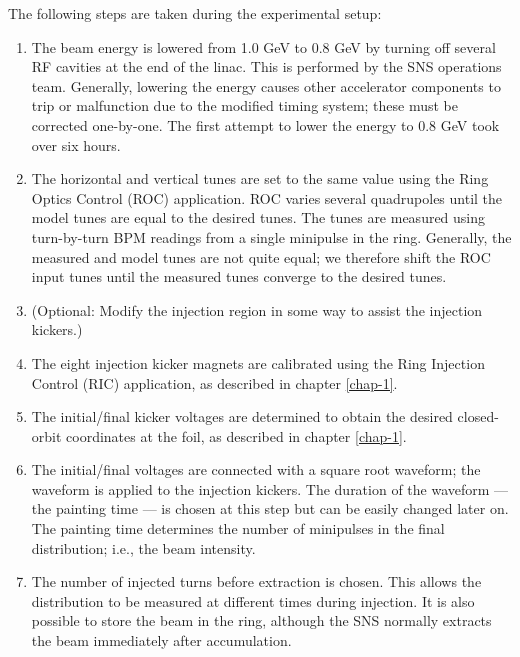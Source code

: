 The following steps are taken during the experimental setup:
%
\begin{enumerate}
    \item 
    The beam energy is lowered from 1.0 GeV to 0.8 GeV by turning off several RF cavities at the end of the linac. This is performed by the SNS operations team. Generally, lowering the energy causes other accelerator components to trip or malfunction due to the modified timing system; these must be corrected one-by-one. The first attempt to lower the energy to 0.8 GeV took over six hours.
    \item
    The horizontal and vertical tunes are set to the same value using the Ring Optics Control (ROC) application. ROC varies several quadrupoles until the model tunes are equal to the desired tunes. The tunes are measured using turn-by-turn BPM readings from a single minipulse in the ring. Generally, the measured and model tunes are not quite equal; we therefore shift the ROC input tunes until the measured tunes converge to the desired tunes. 
    \item
    (Optional: Modify the injection region in some way to assist the injection kickers.)
    \item
    The eight injection kicker magnets are calibrated using the Ring Injection Control (RIC) application, as described in chapter \ref{chap-1}. 
    \item
    The initial/final kicker voltages are determined to obtain the desired closed-orbit coordinates at the foil, as described in chapter \ref{chap-1}.
    \item
    The initial/final voltages are connected with a square root waveform; the waveform is applied to the injection kickers. The duration of the waveform — the painting time — is chosen at this step but can be easily changed later on. The painting time determines the number of minipulses in the final distribution; i.e., the beam intensity.
    \item
    The number of injected turns before extraction is chosen. This allows the distribution to be measured at different times during injection.  It is also possible to store the beam in the ring, although the SNS normally extracts the beam immediately after accumulation.
\end{enumerate}
%
